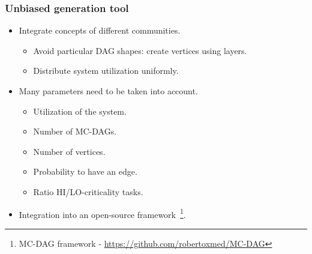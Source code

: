 \documentclass[xcolor=table]{beamer}
\begin{document}
\begin{frame}
	\frametitle{Unbiased generation tool}		
	\begin{itemize}
		\item Integrate concepts of different communities.
		\begin{itemize}
			\item Avoid particular DAG shapes: create vertices using 
			layers.
			\item Distribute system utilization 
			uniformly.
		\end{itemize}
		\item Many parameters need to be taken into account.
		\begin{itemize}
			\item Utilization of the system.
			\item Number of MC-DAGs.
			\item Number of vertices.
			\item Probability to have an edge.
			\item Ratio HI/LO-criticality tasks.
		\end{itemize}
		\item Integration into an open-source framework~\footnote{MC-DAG 
			framework - \url{https://github.com/robertoxmed/MC-DAG}}.
	\end{itemize}
\end{frame}

\end{document}
